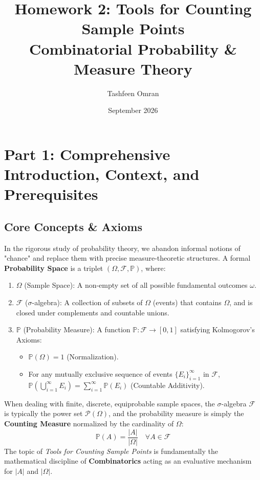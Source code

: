 \documentclass[11pt]{article}
\title{\textbf{Homework 2: Tools for Counting Sample Points \\ \large Combinatorial Probability \& Measure Theory}}
\author{Tashfeen Omran}
\date{September 2026}
\theoremstyle{definition}
\theoremstyle{plain}
\theoremstyle{remark}
\newcommand{\Prob}{\mathbb{P}}
\newcommand{\F}{\mathcal{F}}
\newcommand{\sample}{\Omega}
\newcommand{\powerset}{\mathcal{P}}
\begin{document}
\maketitle
\tableofcontents
\newpage

\section{Part 1: Comprehensive Introduction, Context, and Prerequisites}

\subsection{Core Concepts \& Axioms}
In the rigorous study of probability theory, we abandon informal notions of "chance" and replace them with precise measure-theoretic structures. A formal \textbf{Probability Space} is a triplet $(\sample, \F, \Prob)$, where:
\begin{enumerate}
    \item $\sample$ (Sample Space): A non-empty set of all possible fundamental outcomes $\omega$.
    \item $\F$ ($\sigma$-algebra): A collection of subsets of $\sample$ (events) that contains $\sample$, and is closed under complements and countable unions.
    \item $\Prob$ (Probability Measure): A function $\Prob : \F \to [0, 1]$ satisfying Kolmogorov's Axioms:
    \begin{itemize}
        \item $\Prob(\sample) = 1$ (Normalization).
        \item For any mutually exclusive sequence of events $\{E_i\}_{i=1}^{\infty}$ in $\F$, $\Prob\left(\bigcup_{i=1}^{\infty} E_i\right) = \sum_{i=1}^{\infty} \Prob(E_i)$ (Countable Additivity).
    \end{itemize}
\end{enumerate}

When dealing with finite, discrete, equiprobable sample spaces, the $\sigma$-algebra $\F$ is typically the power set $\powerset(\sample)$, and the probability measure is simply the \textbf{Counting Measure} normalized by the cardinality of $\sample$:
\[
\Prob(A) = \frac{|A|}{|\sample|} \quad \forall A \in \F
\]
The topic of \textit{Tools for Counting Sample Points} is fundamentally the mathematical discipline of \textbf{Combinatorics} acting as an evaluative mechanism for $|A|$ and $|\sample|$.
\end{document}
